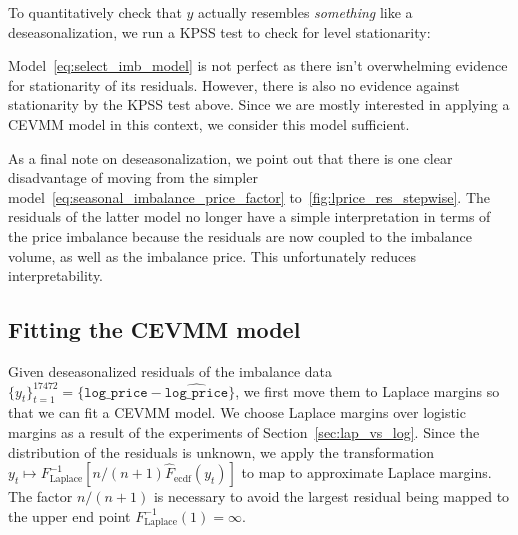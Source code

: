 \documentclass[11pt,twoside,openany]{book}
\newcommand{\code}[1]{\texttt{#1}}
\numberwithin{Theorem}{chapter}
\numberwithin{Definition}{chapter}
\numberwithin{Lemma}{chapter}
\numberwithin{Algorithm}{chapter}
\numberwithin{equation}{chapter}
\begin{document}
To quantitatively check that $y$
actually resembles {\it something} like a deseasonalization, we run a KPSS test
 to check for level stationarity:



Model~\eqref{eq:select_imb_model} is not perfect as
there isn't overwhelming evidence for stationarity of its residuals.
However, there is also no evidence against stationarity by the KPSS test above.
Since we are mostly interested in applying a CEVMM model in this context, we consider
this model sufficient.

As a final note on deseasonalization, we point out that there is one clear
disadvantage of moving from the simpler
model~\eqref{eq:seasonal_imbalance_price_factor}
to~\ref{fig:lprice_res_stepwise}. The residuals of the latter model no longer
have a simple interpretation in terms of the price imbalance
because the residuals are now coupled to the imbalance volume, as well as
the imbalance price. This unfortunately reduces interpretability.








\subsection{Fitting the CEVMM model}

Given deseasonalized residuals of the imbalance data $\{y_t\}_{t=1}^{17472} =
\{\code{log_price} - \widehat{\code{log_price}}\}$,
we first move them to Laplace margins so that we can fit a CEVMM model.
We choose Laplace margins over logistic margins as a result of the experiments
of Section~\ref{sec:lap_vs_log}.
Since the distribution of the residuals is unknown, we apply
the transformation $y_t \mapsto F^{-1}_{\text{Laplace}}[n/(n+1)\hat F_{\text{ecdf}}(y_t)]$
to map to approximate Laplace margins. The factor $n/(n+1)$ is necessary to
avoid the largest residual being mapped to the upper end point $F_{\text{Laplace}}^{-1}(1) = \infty$.
\end{document}

